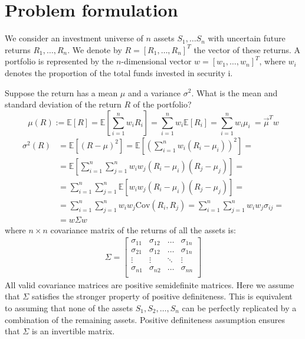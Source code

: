 \documentclass{article}
\begin{document}
\section{Problem formulation}
We consider an investment universe of $n$ assets $S_1, \dots S_n$ with uncertain future returns $R_1, \dots, R_n$. We denote by $R = [R_1, \dots, R_n]^T$ the vector of these returns. A portfolio is represented by the $n$-dimensional vector $ w= [w_1, \dots, w_n]^T$, where $w_i$ denotes the proportion of the total funds invested in security i. 

Suppose the return has a mean $\mu$ and a variance $\sigma^2$. What is the mean and standard deviation of the return $R$ of the portfolio? 
\[\mu(R) := \mathbb{E} [R] = \mathbb{E} \left[ \sum_{i=1}^n w_i R_i\right] =  \sum_{i=1}^n w_i \mathbb{E} [R_i] =  \sum_{i=1}^n w_i \mu_i\ = \vec{\mu}^T w\]
\begin{align*}
\sigma^2 (R) &= \mathbb{E}\left[(R - \mu)^2\right] = \mathbb{E}\left[\left(\sum_{i=1}^n w_i(R_i - \mu_i)\right)^2\right] = \\
&= \mathbb{E}\left[\sum_{i=1}^n \sum_{j=1}^n w_i w_j(R_i - \mu_i)(R_j - \mu_j)\right] =\\ 
&=\sum_{i=1}^n \sum_{j=1}^n \mathbb{E} \left[ w_i w_j(R_i - \mu_i)(R_j - \mu_j)\right] = \\
&=\sum_{i=1}^n \sum_{j=1}^n w_i w_j \mathrm{Cov} (R_i, R_j) = \sum_{i=1}^n \sum_{j=1}^n w_i w_j \sigma_{ij} =\\
&= w \Sigma w
\end{align*}
where $n\times n$ covariance matrix of the returns of all the assets is:
\begin{align*}
\Sigma = \begin{bmatrix}
\sigma_{11} & \sigma_{12} & \dots & \sigma_{1n}\\
\sigma_{21} & \sigma_{12} & \dots & \sigma_{1n}\\
\vdots & \vdots & \ddots & \vdots \\
\sigma_{n1} & \sigma_{n2} & \dots & \sigma_{nn}\\
\end{bmatrix}
\end{align*}
All valid covariance matrices are positive semidefinite matrices. Here we assume that $\Sigma$ satisfies the stronger property of positive definiteness. This is equivalent to assuming that none of the assets $S_1, S_2, \dots,S_n$ can be perfectly replicated by a combination of the remaining assets. Positive definiteness assumption ensures that $\Sigma$ is an invertible matrix. 
\end{document}
